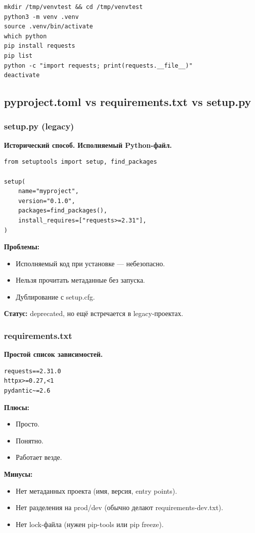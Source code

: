 \begin{lstlisting}
mkdir /tmp/venvtest && cd /tmp/venvtest
python3 -m venv .venv
source .venv/bin/activate
which python
pip install requests
pip list
python -c "import requests; print(requests.__file__)"
deactivate
\end{lstlisting}

\subsection{ pyproject.toml vs requirements.txt vs setup.py}
\subsubsection{ setup.py (legacy)}

\textbf{Исторический способ. Исполняемый Python-файл.}
\begin{lstlisting}
from setuptools import setup, find_packages

setup(
    name="myproject",
    version="0.1.0",
    packages=find_packages(),
    install_requires=["requests>=2.31"],
)
\end{lstlisting}

\textbf{Проблемы:}
\begin{itemize}
\item Исполняемый код при установке — небезопасно.
\item Нельзя прочитать метаданные без запуска.
\item Дублирование с setup.cfg.
\end{itemize}

\textbf{Статус:} deprecated, но ещё встречается в legacy-проектах.

\subsubsection{requirements.txt}

\textbf{Простой список зависимостей.}
\begin{lstlisting}
requests==2.31.0
httpx>=0.27,<1
pydantic~=2.6
\end{lstlisting}

\textbf{Плюсы:}
\begin{itemize}
\item Просто.
\item Понятно.
\item Работает везде.
\end{itemize}

\textbf{Минусы:}
\begin{itemize}
\item Нет метаданных проекта (имя, версия, entry points).
\item Нет разделения на prod/dev (обычно делают requirements-dev.txt).
\item Нет lock-файла (нужен pip-tools или pip freeze).
\end{itemize}


